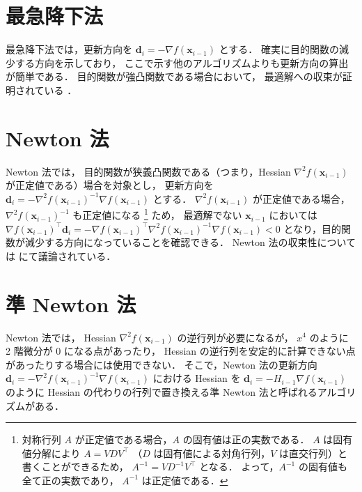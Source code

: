 \section{最急降下法}\label{sec:optimization_steepest-descent}

最急降下法では，更新方向を $\bm{d}_i = -\nabla f(\bm{x}_{i-1})$ とする．
確実に目的関数の減少する方向を示しており，
ここで示す他のアルゴリズムよりも更新方向の算出が簡単である．
目的関数が強凸関数である場合において，
最適解への収束が証明されている
\cite[Section 9.3.1]{Boyd2004}．

\section{Newton 法}

Newton 法では，
目的関数が狭義凸関数である（つまり，Hessian $\nabla^2 f(\bm{x}_{i-1})$ が正定値である）場合を対象とし，
更新方向を
$\bm{d}_i = -\nabla^2 f(\bm{x}_{i-1})^{-1} \nabla f(\bm{x}_{i-1})$
とする．
$\nabla^2 f(\bm{x}_{i-1})$ が正定値である場合，
$\nabla^2 f(\bm{x}_{i-1})^{-1}$ も正定値になる
\footnote{%
    対称行列 $A$ が正定値である場合，$A$ の固有値は正の実数である．%
    $A$ は固有値分解により $A=VDV^\top$ （$D$ は固有値による対角行列，$V$ は直交行列）と書くことができるため，%
    $A^{-1} = VD^{-1}V^\top$ となる．%
    よって，$A^{-1}$ の固有値も全て正の実数であり，%
    $A^{-1}$ は正定値である．%
}
ため，
最適解でない $\bm{x}_{i-1}$ においては
$\nabla f(\bm{x}_{i-1})^\top \bm{d}_i = -\nabla f(\bm{x}_{i-1})^\top \nabla^2 f(\bm{x}_{i-1})^{-1} \nabla f(\bm{x}_{i-1}) < 0$
となり，目的関数が減少する方向になっていることを確認できる．
Newton 法の収束性については \cite[Section 9.5.3, 9.6.4]{Boyd2004} にて議論されている．

\section{準 Newton 法}\label{sec:optimization_quasi-newton}

Newton 法では，
Hessian $\nabla^2 f(\bm{x}_{i-1})$ の逆行列が必要になるが，
$x^4$ のように 2 階微分が 0 になる点があったり，
Hessian の逆行列を安定的に計算できない点があったりする場合には使用できない．
そこで，Newton 法の更新方向
$\bm{d}_i = -\nabla^2 f(\bm{x}_{i-1})^{-1} \nabla f(\bm{x}_{i-1})$
における Hessian を
$\bm{d}_i = -H_{i-1} \nabla f(\bm{x}_{i-1})$
のように Hessian の代わりの行列で置き換える準 Newton 法と呼ばれるアルゴリズムがある．

